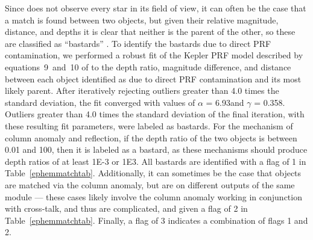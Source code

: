 Since \kepler{} does not observe every star in its field of view, it can often be the case that a match is found between two objects, but given their relative magnitude, distance, and depths it is clear that neither is the parent of the other, so these are classified as ``bastards'' \citep{Coughlin2014a}. To identify the bastards due to direct PRF contamination, we performed a robust fit of the Kepler PRF model described by equations~9~and~10 of \citet{Coughlin2014a} to the depth ratio, magnitude difference, and distance between each object identified as due to direct PRF contamination and its most likely parent. After iteratively rejecting outliers greater than 4.0 times the standard deviation, the fit converged with values of $\alpha$ = 6.93\arcsec and $\gamma$ = 0.358\arcsec. Outliers greater than 4.0 times the standard deviation of the final iteration, with these resulting fit parameters, were labeled as bastards. For the mechanism of column anomaly and reflection, if the depth ratio of the two objects is between 0.01 and 100, then it is labeled as a bastard, as these mechanisms should produce depth ratios of at least 1E-3 or 1E3. All bastards are identified with a flag of 1 in Table~\ref{ephemmatchtab}. Additionally, it can sometimes be the case that objects are matched via the column anomaly, but are on different outputs of the same module --- these cases likely involve the column anomaly working in conjunction with cross-talk, and thus are complicated, and given a flag of 2 in Table~\ref{ephemmatchtab}. Finally, a flag of 3 indicates a combination of flags 1 and 2. 




